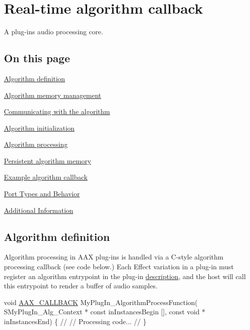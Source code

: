 \hypertarget{a00327}{}\section{Real-\/time algorithm callback}
\label{a00327}
A plug-\/in\textquotesingle{}s audio processing core. 

\hypertarget{a00327_algpagecontents}{}\subsection{On this page}\label{a00327_algpagecontents}
\begin{DoxyItemize}
\item \hyperlink{a00327_alg_def}{Algorithm definition} \item \hyperlink{a00327_alg_memmgmt}{Algorithm memory management} \item \hyperlink{a00327_alg_comm}{Communicating with the algorithm} \item \hyperlink{a00327_alg_initialization}{Algorithm initialization} \item \hyperlink{a00327_alg_processing}{Algorithm processing} \item \hyperlink{a00327_alg_pd}{Persistent algorithm memory} \item \hyperlink{a00327_alg_examp}{Example algorithm callback} \item \hyperlink{a00327_alg_porttypes}{Port Types and Behavior} \item \hyperlink{a00327_alg_seealso}{Additional Information}\end{DoxyItemize}
 \hypertarget{a00327_alg_def}{}\subsection{Algorithm definition}\label{a00327_alg_def}
 Algorithm processing in A\+A\+X plug-\/ins is handled via a C-\/style algorithm processing callback (see code below.) Each Effect variation in a plug-\/in must register an algorithm entrypoint in the plug-\/in \hyperlink{a00326}{description}, and the host will call this entrypoint to render a buffer of audio samples.


\begin{DoxyCode}
\textcolor{keywordtype}{void} \hyperlink{a00149_aaa22112139aa627574b1ef562f579d43}{AAX\_CALLBACK} MyPlugIn\_AlgorithmProcessFunction(
    SMyPlugIn\_Alg\_Context * \textcolor{keyword}{const}   inInstancesBegin [],
    \textcolor{keyword}{const} \textcolor{keywordtype}{void} *                    inInstancesEnd)
    \{
        \textcolor{comment}{//}
        \textcolor{comment}{// Processing code...}
        \textcolor{comment}{//}
    \}
\end{DoxyCode}
 

